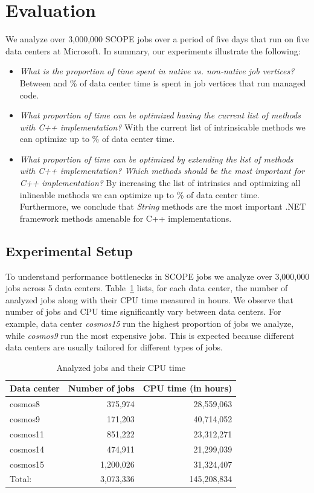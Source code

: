 \section{Evaluation}
We analyze over 3,000,000 SCOPE jobs over a period of five days that run on five data centers at Microsoft. 
In summary, our experiments illustrate the following:

\begin{itemize}
\item \emph{What is the proportion of time spent in native vs. non-native job vertices?}
Between \nonNativeTimeL{} and \nonNativeTimeU \% of data center time is spent in job vertices that run managed code.

\item \emph{What proportion of time can be optimized having the current list of methods with C++ implementation?} 
With the current list of intrinsicable methods we can optimize up to \optimizableU{} \% of data center time.

\item \emph{What proportion of time can be optimized by extending the list of methods with C++ implementation? 
Which methods should be the most important for C++ implementation?}
By increasing the list of intrinsics and optimizing all inlineable methods we can optimize up to \potentiallyOptimizableU{} \% of data center time. 
Furthermore, we conclude that \emph{String} methods are the most important .NET framework methods amenable for C++ implementations.


\end{itemize}

\subsection{Experimental Setup}
To understand performance bottlenecks in SCOPE jobs we analyze over 3,000,000 jobs across 5 data centers.
Table~\ref{tb:projects} lists, for each data center, the number of analyzed jobs along with their CPU time measured in hours.
We observe that number of jobs and CPU time significantly vary between data centers. 
For example, data center \emph{cosmos15} run the highest proportion of jobs we analyze, while \emph{cosmos9} run the most expensive jobs. 
This is expected because different data centers are usually tailored for different types of jobs. 


\begin{table}[ht]
\centering
\begin{tabular}{lrr}
  Data center & Number of jobs & CPU time (in hours) \\
 \midrule
cosmos8 & 375,974 &  28,559,063 \\
cosmos9 & 171,203 &  40,714,052 \\
cosmos11 & 851,222 & 23,312,271\\
cosmos14 & 474,911 & 21,299,039\\
cosmos15 & 1,200,026&31,324,407 \\
\midrule
Total: & 3,073,336 & 145,208,834\\
\midrule
\end{tabular}
 \caption{Analyzed jobs and their CPU time
\label{tb:projects}}
\end{table}

